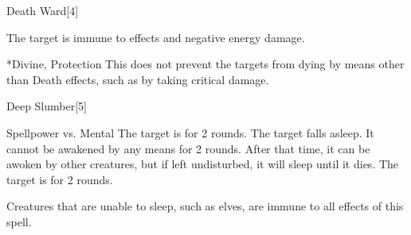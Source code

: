 \begin{spellsection}{Death Ward}[4]
    \begin{spellheader}
    \end{spellheader}
    \begin{spellcontent}
        \begin{spelltargetinginfo}
        \end{spelltargetinginfo}
        \begin{spelleffects}
            \spelleffect The target is immune to  effects and negative energy damage.
            \spelldur \durshort
        \end{spelleffects}
    \end{spellcontent}
    \begin{spellfooter}
        *{Divine, Protection}
        \spellnotes This does not prevent the targets from dying by means other than Death effects, such as by taking critical damage.
        \miscastexplode
    \end{spellfooter}
\end{spellsection}

\begin{spellsection}{Deep Slumber}[5]
    \begin{spellheader}
    \end{spellheader}
    \begin{spellcontent}
        \begin{spelltargetinginfo}
        \end{spelltargetinginfo}
        \begin{spelleffects}
            \begin{spellattack}{Spellpower vs. Mental}
                \spellsuccess The target is \blinded for 2 rounds.
                \spellcritical The target falls asleep. It cannot be awakened by any means for 2 rounds. After that time, it can be awoken by other creatures, but if left undisturbed, it will sleep until it dies.
                \spellfailure The target is \dazed for 2 rounds.
            \end{spellattack}
        \end{spelleffects}
    \end{spellcontent}
    \begin{spellfooter}
        \spellnotes Creatures that are unable to sleep, such as elves, are immune to all effects of this spell.
        \miscastrandom
    \end{spellfooter}
    \begin{spellaugments}
    \end{spellaugments}
\end{spellsection}

